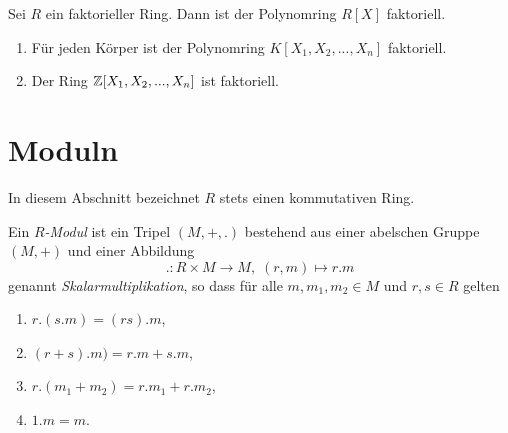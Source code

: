 \documentclass{book}
\begin{document}
\begin{thm}
    \label{thm:fakt}
    Sei $R$ ein faktorieller Ring. Dann ist der Polynomring $R[X]$ faktoriell. 
\end{thm}

\begin{exas}
    \label{exas:faktoriell}
    \begin{enumerate}
        \item Für jeden Körper ist der Polynomring $K[X_1,X_2,...,X_n]$ faktoriell.
        \item Der Ring $\mathbb{Z}[X_1,X_2,...,X_n]$ ist faktoriell. 
    \end{enumerate}
\end{exas}

\section{Moduln}%
\label{sec:moduln}

In diesem Abschnitt bezeichnet $R$ stets einen kommutativen Ring. 

\begin{defi}
    \label{defi:modul}
    Ein \emph{$R$-Modul} ist ein Tripel $(M,+,.)$ bestehend
    aus einer abelschen Gruppe $(M,+)$ und einer Abbildung
    \[
        .: R \times M \to M, \; (r,m) \mapsto r.m
    \]
    genannt {\em Skalarmultiplikation}, so dass für alle $m,m_1,m_2 \in M$ und
    $r,s \in R$ gelten
    \begin{enumerate}[label=(M\arabic*)]
        \item $r.(s.m) = (rs).m$,
        \item $(r+s).m) = r.m + s.m$,
        \item $r.(m_1 + m_2) = r.m_1 + r. m_2$,
        \item $1.m = m$. 
    \end{enumerate}
\end{defi}
\end{document}

